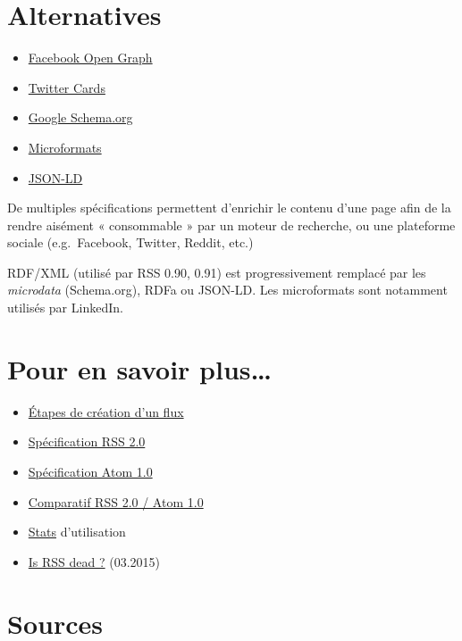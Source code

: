 \hypertarget{alternatives}{%
\section{Alternatives}\label{alternatives}}

\begin{itemize}
\tightlist
\item
  \href{http://ogp.me/}{Facebook Open Graph}
\item
  \href{https://dev.twitter.com/cards/overview}{Twitter Cards}
\item
  \href{http://schema.org/}{Google Schema.org}
\item
  \href{http://microformats.org/}{Microformats}
\item
  \href{http://json-ld.org/}{JSON-LD}
\end{itemize}

De multiples spécifications permettent d'enrichir le contenu d'une page
afin de la rendre aisément « consommable » par un moteur de recherche,
ou une plateforme sociale (e.g.~Facebook, Twitter, Reddit, etc.)

RDF/XML (utilisé par RSS 0.90, 0.91) est progressivement remplacé par
les \emph{microdata} (Schema.org), RDFa ou JSON-LD. Les microformats
sont notamment utilisés par LinkedIn.

\hypertarget{pour-en-savoir-plus}{%
\section{Pour en savoir plus\ldots{}}\label{pour-en-savoir-plus}}

\begin{itemize}
\tightlist
\item
  \href{http://www.xul.fr/xml-rss.html}{Étapes de création d'un flux}
\item
  \href{http://www.rssboard.org/rss-specification}{Spécification RSS
  2.0}
\item
  \href{https://tools.ietf.org/html/rfc4287}{Spécification Atom 1.0}
\item
  \href{http://www.differencebetween.info/difference-between-rss-and-atom}{Comparatif
  RSS 2.0 / Atom 1.0}
\item
  \href{https://trends.builtwith.com/feeds}{Stats} d'utilisation
\item
  \href{http://www.makeuseof.com/tag/rss-dead-look-numbers/}{Is RSS dead
  ?} (03.2015)
\end{itemize}

\hypertarget{sources}{%
\section{Sources}\label{sources}}
